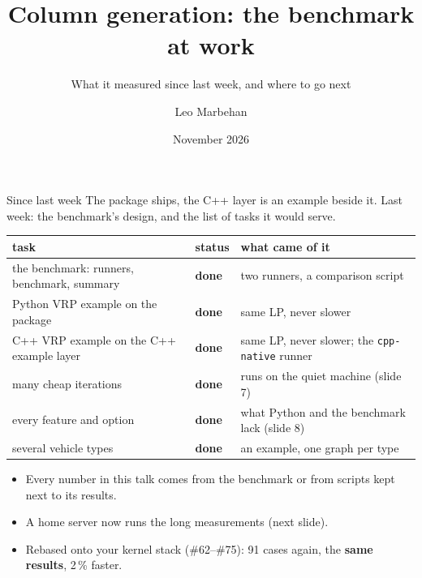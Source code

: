 \documentclass[aspectratio=169]{beamer}
\title{Column generation: the benchmark at work}
\subtitle{What it measured since last week, and where to go next}
\author{Leo Marbehan}
\date{November 2026}
\newcommand{\done}{\textcolor{GLGreen}{\textbf{done}}}
\begin{document}
\begin{frame}[plain]
  \titlepage
\end{frame}

\begin{frame}{Since last week}
  The package ships, the C++ layer is an example beside it. Last week: the benchmark's design, and the list of
  tasks it would serve.

  \vspace{0.2em}
  \footnotesize
  \begin{tabular}{@{}>{\raggedright\arraybackslash}p{}>{\raggedright\arraybackslash}p{}
      >{\raggedright\arraybackslash}p{}@{}}
    \toprule
    task & status & what came of it \\
    \midrule
    the benchmark: runners, benchmark, summary & \done & two runners, a comparison script \\
    Python VRP example on the package & \done & same LP, never slower \\
    C++ VRP example on the C++ example layer & \done & same LP, never slower; the \texttt{cpp-native} runner \\
    many cheap iterations & \done & 399 runs on the quiet machine (slide 7) \\
    every feature and option & \done & what Python and the benchmark lack (slide 8) \\
    several vehicle types & \done & an example, one graph per type  \\
    \bottomrule
  \end{tabular}

  \begin{itemize}\footnotesize
    \item Every number in this talk comes from the benchmark or from scripts kept next to its results.
    \item A home server now runs the long measurements (next slide).
    \item Rebased onto your kernel stack (\#62--\#75): 91 cases again, the \textbf{same results}, 2\,\% faster.
  \end{itemize}
\end{frame}
\end{document}
